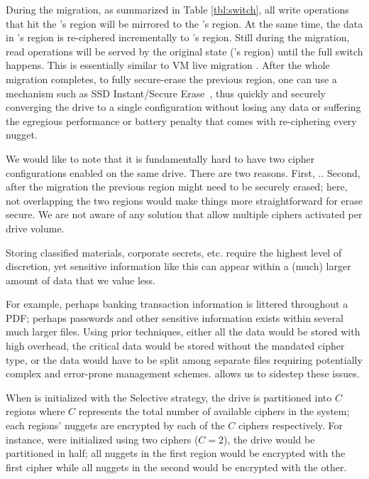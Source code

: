 During the migration, as summarized in Table \cref{tbl:switch}, all write
operations that hit the \cone's region will be mirrored to the \ctwo's region.
At the same time, the data in \cone's region is re-ciphered incrementally to
\ctwo's region. Still during the migration, read operations will be served by
the original state (\cone's region) until the full switch happens. This is
essentially similar to VM live migration \cite{live-vm-migration}. After
the whole migration completes, to fully secure-erase the previous region, one
can use a mechanism such as SSD Instant/Secure Erase~\cite{ISE1,ISE2,ISE3}, thus
quickly and securely converging the drive to a single configuration without
losing any data or suffering the egregious performance or battery penalty that
comes with re-ciphering every nugget.

We would like to note that it is fundamentally hard to have two cipher
configurations enabled on the same drive. There are two reasons. First,
.. Second, after the migration the
previous region might need to be securely erased; here, not overlapping the two
regions would make things more straightforward for erase secure. We are not
aware of any solution that allow multiple ciphers activated per drive volume.



 Storing classified materials, corporate secrets,
etc. require the highest level of discretion, yet sensitive information like
this can appear within a (much) larger amount of data that we value less.

For example, perhaps banking transaction information is littered throughout a
PDF; perhaps passwords and other sensitive information exists within several
much larger files. Using prior techniques, either all the data would be stored
with high overhead, the critical data would be stored without the mandated
cipher type, or the data would have to be split among separate files requiring
potentially complex and error-prone management schemes. \sys allows us to
sidestep these issues.


When \sys is initialized with the Selective strategy, the drive is partitioned
into $C$ regions where $C$ represents the total number of available ciphers in
the system; each regions' nuggets are encrypted by each of the $C$ ciphers
respectively. For instance, were \sys initialized using two ciphers ($C = 2$),
the drive would be partitioned in half; all nuggets in the first region would be
encrypted with the first cipher while all nuggets in the second would be
encrypted with the other.

